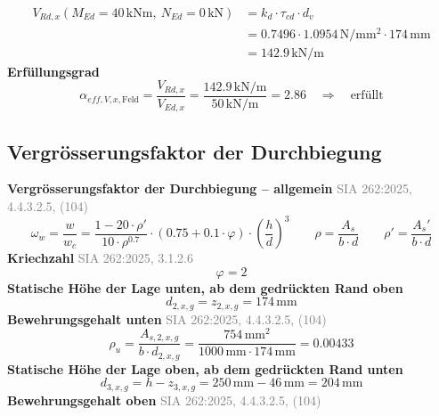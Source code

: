 \documentclass[11pt,a4paper]{article}
\newcommand{\normref}[1]{{\small\textcolor{gray}{#1}}}
\begin{document}
\begin{equation*}
\begin{aligned}
  V_{Rd,x}(M_{Ed} = 40\,\mathrm{kNm},\ N_{Ed} = 0\,\mathrm{kN}) &= k_d \cdot \tau_{cd} \cdot d_v \\
  &= 0.7496 \cdot 1.0954\,\mathrm{N}/\mathrm{mm}^{2} \cdot 174\,\mathrm{mm} \\
  &= 142.9\,\mathrm{kN}/\mathrm{m}
\end{aligned}
\end{equation*}
\noindent\textbf{Erfüllungsgrad}
\begin{equation*}
\alpha_{eff,V,x,\text{Feld}} = \frac{V_{Rd,x}}{V_{Ed,x}} = \frac{142.9\,\mathrm{kN}/\mathrm{m}}{50\,\mathrm{kN}/\mathrm{m}} = 2.86 \quad \Rightarrow \quad \text{erfüllt}
\end{equation*}
\subsection{Vergrösserungsfaktor der Durchbiegung}
\noindent\textbf{Vergrösserungsfaktor der Durchbiegung – allgemein} \hfill \normref{SIA 262:2025, 4.4.3.2.5, (104)}
\begin{equation*}
\omega_w = \frac{w}{w_c} = \frac{1 - 20 \cdot \rho'}{10 \cdot \rho^{0.7}} \cdot \left(0.75 + 0.1 \cdot \varphi\right) \cdot \left(\frac{h}{d}\right)^{3} \qquad \rho = \frac{A_s}{b \cdot d} \qquad \rho' = \frac{A_s'}{b \cdot d}
\end{equation*}
\noindent\textbf{Kriechzahl} \hfill \normref{SIA 262:2025, 3.1.2.6}
\begin{equation*}
\varphi = 2
\end{equation*}
\noindent\textbf{Statische Höhe der Lage unten, ab dem gedrückten Rand oben}
\begin{equation*}
d_{2,x,g} = z_{2,x,g} = 174\,\mathrm{mm}
\end{equation*}
\noindent\textbf{Bewehrungsgehalt unten} \hfill \normref{SIA 262:2025, 4.4.3.2.5, (104)}
\begin{equation*}
\rho_{u} = \frac{A_{s,2,x,g}}{b \cdot d_{2,x,g}} = \frac{754\,\mathrm{mm}^{2}}{1000\,\mathrm{mm} \cdot 174\,\mathrm{mm}} = 0.00433
\end{equation*}
\noindent\textbf{Statische Höhe der Lage oben, ab dem gedrückten Rand unten}
\begin{equation*}
d_{3,x,g} = h - z_{3,x,g} = 250\,\mathrm{mm} - 46\,\mathrm{mm} = 204\,\mathrm{mm}
\end{equation*}
\noindent\textbf{Bewehrungsgehalt oben} \hfill \normref{SIA 262:2025, 4.4.3.2.5, (104)}
\end{document}

